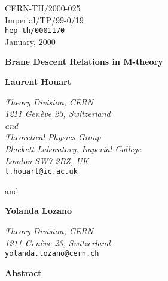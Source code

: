 \documentclass[12pt,a4paper]{article}
\begin{document}
\begin{flushright}
\footnotesize
\footnotesize
CERN-TH/2000-025\\
Imperial/TP/99-0/19\\
{\tt hep-th/0001170}\\
January, $2000$
\normalsize
\end{flushright}

\begin{center}



\vspace{.8cm}
{\LARGE {\bf Brane Descent Relations in M-theory}}

\vspace{1cm}


{\bf Laurent Houart}

\vspace{.1cm}

{
{\it Theory Division, CERN\\
1211 Gen\`eve 23, Switzerland\\
and \\
Theoretical Physics Group\\
Blackett Laboratory,
Imperial College \\
London SW7 2BZ, UK}\\
{\tt l.houart@ic.ac.uk}
}

\vspace{.3cm}

{and}

\vspace{.3cm}


{\bf Yolanda Lozano}

\vspace{.1cm}

{
{\it Theory Division, CERN\\
1211 Gen\`eve 23, Switzerland}\\
{\tt yolanda.lozano@cern.ch}
}

\vspace{.4cm}



\vspace{1cm}


{\bf Abstract}

\end{center}
\end{document}
